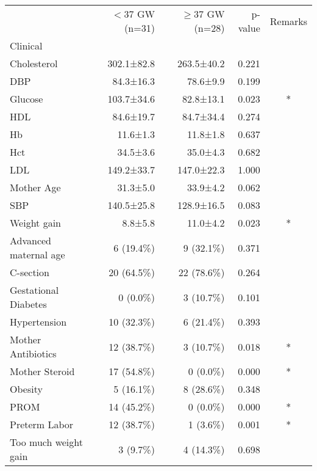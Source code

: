 \begin{tabular}{lrrrc}
\toprule
{} & $<$37 GW (n=31) & $\ge$37 GW (n=28) & p-value & Remarks \\
Clinical              &               &               &         &         \\
\midrule
Cholesterol           &    302.1±82.8 &    263.5±40.2 &   0.221 &         \\
DBP                   &     84.3±16.3 &      78.6±9.9 &   0.199 &         \\
Glucose               &    103.7±34.6 &     82.8±13.1 &   0.023 &       * \\
HDL                   &     84.6±19.7 &     84.7±34.4 &   0.274 &         \\
Hb                    &      11.6±1.3 &      11.8±1.8 &   0.637 &         \\
Hct                   &      34.5±3.6 &      35.0±4.3 &   0.682 &         \\
LDL                   &    149.2±33.7 &    147.0±22.3 &   1.000 &         \\
Mother Age            &      31.3±5.0 &      33.9±4.2 &   0.062 &         \\
SBP                   &    140.5±25.8 &    128.9±16.5 &   0.083 &         \\
Weight gain           &       8.8±5.8 &      11.0±4.2 &   0.023 &       * \\
Advanced maternal age &     6 (19.4\%) &     9 (32.1\%) &   0.371 &         \\
C-section             &    20 (64.5\%) &    22 (78.6\%) &   0.264 &         \\
Gestational Diabetes  &      0 (0.0\%) &     3 (10.7\%) &   0.101 &         \\
Hypertension          &    10 (32.3\%) &     6 (21.4\%) &   0.393 &         \\
Mother Antibiotics    &    12 (38.7\%) &     3 (10.7\%) &   0.018 &       * \\
Mother Steroid        &    17 (54.8\%) &      0 (0.0\%) &   0.000 &       * \\
Obesity               &     5 (16.1\%) &     8 (28.6\%) &   0.348 &         \\
PROM                  &    14 (45.2\%) &      0 (0.0\%) &   0.000 &       * \\
Preterm Labor         &    12 (38.7\%) &      1 (3.6\%) &   0.001 &       * \\
Too much weight gain  &      3 (9.7\%) &     4 (14.3\%) &   0.698 &         \\
\bottomrule
\end{tabular}
